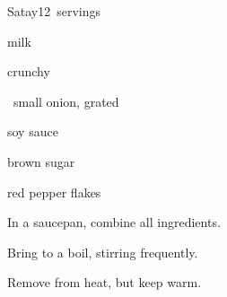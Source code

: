 \begin{recipe}{Satay}{}{12~servings}

\begin{ingredients}
\item {}  milk
\item \C{\half} crunchy 
\item \half{}~small onion, grated
\item {} soy sauce
\item {} brown sugar
\item \tp{\half} red pepper flakes
\end{ingredients}

\begin{directions}
\item In a saucepan, combine all ingredients.
\item Bring to a boil, stirring frequently.
\item Remove from heat, but keep warm.
\end{directions}

\end{recipe}
